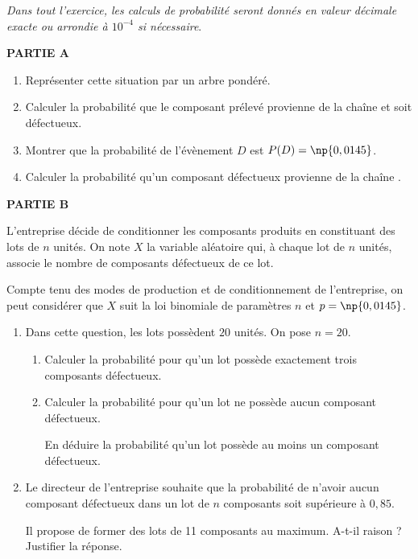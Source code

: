 \documentclass[10pt,a4paper]{article}
\begin{document}
\emph{Dans tout l'exercice, les calculs de probabilité seront donnés en valeur décimale exacte ou arrondie à $10^{-4}$ si nécessaire}.

\medskip

\textbf{PARTIE A}

\medskip

\begin{enumerate}
\item Représenter cette situation par un arbre pondéré.
\item Calculer la probabilité que le composant prélevé provienne de la chaîne  et soit
défectueux.
\item Montrer que la probabilité de l'évènement $D$ est $P(D) = \np{0,0145}$.
\item Calculer la probabilité qu'un composant défectueux provienne de la chaîne .
\end{enumerate}

\medskip

\textbf{PARTIE B}

\medskip

L'entreprise décide de conditionner les composants produits en constituant des lots de $n$ unités. On note $X$ la variable aléatoire qui, à chaque lot de $n$ unités, associe le nombre de composants défectueux de ce lot.

Compte tenu des modes de production et de conditionnement de l'entreprise, on peut considérer que $X$ suit la loi binomiale de paramètres $n$ et $p = \np{0,0145}$.

\medskip

\begin{enumerate}
\item Dans cette question, les lots possèdent $20$ unités. On pose $n = 20$.
	\begin{enumerate}
		\item Calculer la probabilité pour qu'un lot possède exactement trois composants défectueux.
		\item Calculer la probabilité pour qu'un lot ne possède aucun composant défectueux.
		
En déduire la probabilité qu'un lot possède au moins un composant défectueux.
	\end{enumerate}
\item  Le directeur de l'entreprise souhaite que la probabilité de n'avoir aucun composant
défectueux dans un lot de $n$ composants soit supérieure à $0,85$.

Il propose de former des lots de 11 composants au maximum. A-t-il raison ? Justifier la réponse.
\end{enumerate}
\end{document}
